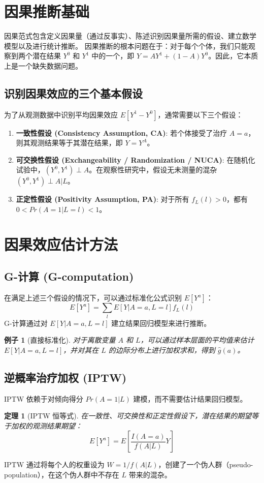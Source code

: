 \documentclass[UTF8]{ctexart}
\newtheorem{theorem}{定理}
\newtheorem{example}{例子}
\begin{document}
\section{因果推断基础}
因果范式包含定义因果量（通过反事实）、陈述识别因果量所需的假设、建立数学模型以及进行统计推断。
因果推断的根本问题在于：对于每个个体，我们只能观察到两个潜在结果 $Y^0$ 和 $Y^1$ 中的一个，即 $Y = A Y^1 + (1 - A) Y^0$。因此，它本质上是一个缺失数据问题。

\subsection{识别因果效应的三个基本假设}
为了从观测数据中识别平均因果效应 $E[Y^1 - Y^0]$，通常需要以下三个假设：
\begin{enumerate}
    \item \textbf{一致性假设 (Consistency Assumption, CA)}: 若个体接受了治疗 $A=a$，则其观测结果等于其潜在结果，即 $Y = Y^A$。
    \item \textbf{可交换性假设 (Exchangeability / Randomization / NUCA)}: 在随机化试验中，$(Y^0, Y^1) \perp A$。在观察性研究中，假设无未测量的混杂 $(Y^0, Y^1) \perp A | L$。
    \item \textbf{正定性假设 (Positivity Assumption, PA)}: 对于所有 $f_L(l) > 0$，都有 $0 < Pr(A=1|L=l) < 1$。
\end{enumerate}

\section{因果效应估计方法}

\subsection{G-计算 (G-computation)}
在满足上述三个假设的情况下，可以通过标准化公式识别 $E[Y^a]$：
$$ E[Y^a] = \sum_l E[Y|A=a, L=l] f_L(l) $$
G-计算通过对 $E[Y|A=a, L=l]$ 建立结果回归模型来进行推断。

\begin{example}[直接标准化]
对于离散变量 $A$ 和 $L$，可以通过样本层面的平均值来估计 $E[Y|A=a, L=l]$，并对其在 $L$ 的边际分布上进行加权求和，得到 $\hat{g}(a)$。
\end{example}

\subsection{逆概率治疗加权 (IPTW)}
IPTW 依赖于对倾向得分 $Pr(A=1|L)$ 建模，而不需要估计结果回归模型。
\begin{theorem}[IPTW 恒等式]
在一致性、可交换性和正定性假设下，潜在结果的期望等于加权的观测结果期望：
$$ E[Y^a] = E \left[ \frac{I(A=a)}{f(A|L)} Y \right] $$
\end{theorem}
IPTW 通过将每个人的权重设为 $W = 1/f(A|L)$，创建了一个伪人群（pseudo-population），在这个伪人群中不存在 $L$ 带来的混杂。
\end{document}
